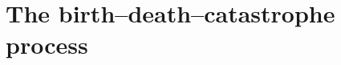 
\chapter{The birth--death--catastrophe process}
\label{bdc:ch:core}










\begingroup
\renewcommand{\theHsection}{\thechapter.appendix.\Alph{section}}
\renewcommand{\theHsubsection}{\theHsection.\arabic{subsection}}
\renewcommand{\theHsubsubsection}{\theHsubsection.\arabic{subsubsection}}

\endgroup
